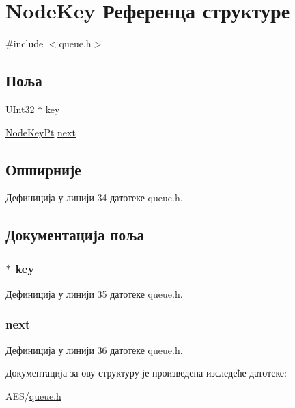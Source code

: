 \hypertarget{struct_node_key}{\section{Node\+Key Референца структуре}
\label{struct_node_key}
}


{\ttfamily \#include $<$queue.\+h$>$}

\subsection*{Поља}
\begin{DoxyCompactItemize}
\item 
\hyperlink{queue_8h_ab6132671e695a54d5c39ed9ce1536087}{U\+Int32} $\ast$ \hyperlink{struct_node_key_ac90bd7fcf80a42bfcb7e48b8e40a66bd}{key}
\item 
\hyperlink{queue_8h_a3bac5142f1f85d4e0969776aea360873}{Node\+Key\+Pt} \hyperlink{struct_node_key_a097a8667dc15f1ee2b8ff9f44d5d438e}{next}
\end{DoxyCompactItemize}


\subsection{Опширније}


Дефиниција у линији 34 датотеке queue.\+h.



\subsection{Документација поља}
\hypertarget{struct_node_key_ac90bd7fcf80a42bfcb7e48b8e40a66bd}{
\subsubsection[{key}]{$\ast$ key}}\label{struct_node_key_ac90bd7fcf80a42bfcb7e48b8e40a66bd}


Дефиниција у линији 35 датотеке queue.\+h.

\hypertarget{struct_node_key_a097a8667dc15f1ee2b8ff9f44d5d438e}{
\subsubsection[{next}]{ next}}\label{struct_node_key_a097a8667dc15f1ee2b8ff9f44d5d438e}


Дефиниција у линији 36 датотеке queue.\+h.



Документација за ову структуру је произведена изследеће датотеке\+:\begin{DoxyCompactItemize}
\item 
A\+E\+S/\hyperlink{queue_8h}{queue.\+h}\end{DoxyCompactItemize}
